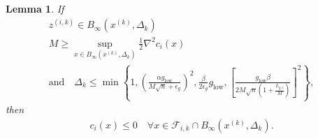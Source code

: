 \documentclass{article}
\newtheorem{lemma}[theorem]{Lemma}
\theoremstyle{case}
\newcommand{\xk}{{x^{(k)}}}
\newcommand{\dk}{\Delta_k}
\newcommand{\fik}{{\mathcal F_{i, k}}}
\newcommand{\lgi}{{L_{g, i}}}
\newcommand{\tr}{{ B_{\infty}\left(\xk, \dk\right) }}
\begin{document}
\begin{lemma}
If 
\begin{align}
z^{(i, k)} \in \tr \label{z_is_active} \\
M \ge \sup_{x \in \tr} \frac 1 2 \nabla^2 c_i(x) \label{m_bounds} \\
\text{and} \quad \dk \le \min\left\{
1,
\left(\frac{\alpha g_{\text{low}}}{M \sqrt{n} + \epsilon_g}\right)^2,
\frac{\beta}{2\epsilon_{g}}g_{\text{low}},
\left[\frac {g_{\text{low}} \beta} {2M\sqrt{n}\left(1 + \frac {\lgi} M \right)} \right]^2
\right\}, \label{delta_is_small_enough}
\end{align} then
\begin{align*}
c_i(x) \le 0 \quad \forall x \in \fik \cap \tr.
\end{align*}

\end{lemma}
\end{document}
